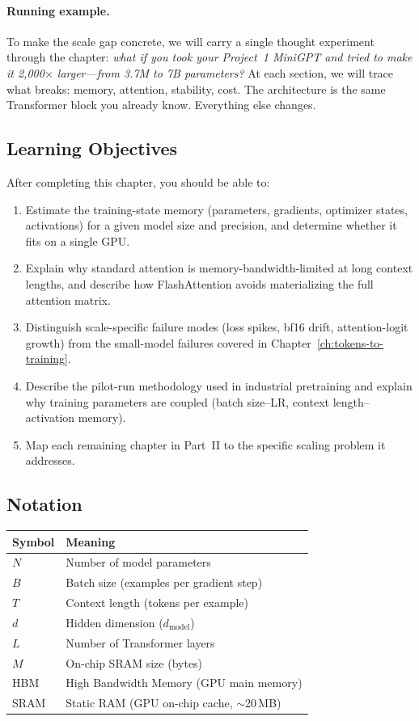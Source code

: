 \paragraph{Running example.} To make the scale gap concrete, we will carry a single thought experiment through the chapter: \emph{what if you took your Project~1 MiniGPT and tried to make it 2,000$\times$ larger---from 3.7M to 7B parameters?} At each section, we will trace what breaks: memory, attention, stability, cost. The architecture is the same Transformer block you already know. Everything else changes.


\subsection*{Learning Objectives}

After completing this chapter, you should be able to:

\begin{enumerate}
  \item Estimate the training-state memory (parameters, gradients, optimizer states, activations) for a given model size and precision, and determine whether it fits on a single GPU.
  \item Explain why standard attention is memory-bandwidth-limited at long context lengths, and describe how FlashAttention avoids materializing the full attention matrix.
  \item Distinguish scale-specific failure modes (loss spikes, bf16 drift, attention-logit growth) from the small-model failures covered in Chapter~\ref{ch:tokens-to-training}.
  \item Describe the pilot-run methodology used in industrial pretraining and explain why training parameters are coupled (batch size--LR, context length--activation memory).
  \item Map each remaining chapter in Part~II to the specific scaling problem it addresses.
\end{enumerate}


\subsection*{Notation}

\begin{center}
\begin{tabular}{ll}
\toprule
Symbol & Meaning \\
\midrule
$N$ & Number of model parameters \\
$B$ & Batch size (examples per gradient step) \\
$T$ & Context length (tokens per example) \\
$d$ & Hidden dimension ($d_{\text{model}}$) \\
$L$ & Number of Transformer layers \\
$M$ & On-chip SRAM size (bytes) \\
HBM & High Bandwidth Memory (GPU main memory) \\
SRAM & Static RAM (GPU on-chip cache, $\sim$20\,MB) \\
\bottomrule
\end{tabular}
\end{center}


